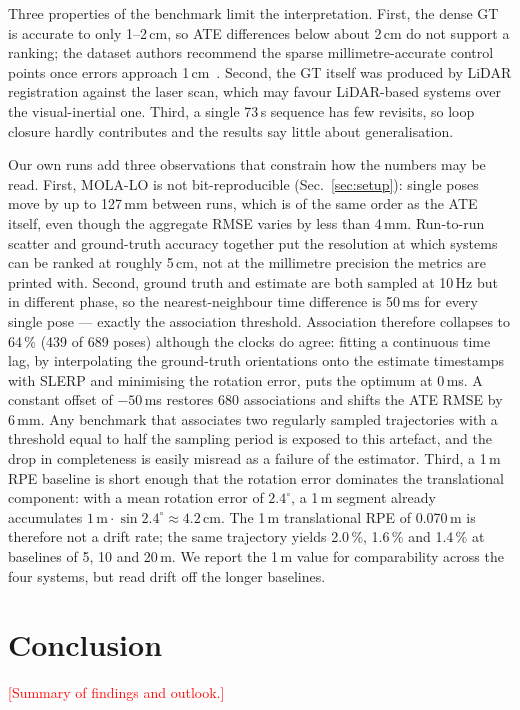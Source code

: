 \documentclass[conference]{IEEEtran}
\newcommand{\todo}[1]{\textcolor{red}{[#1]}}
\begin{document}
Three properties of the benchmark limit the interpretation. First, the dense GT is accurate to
only 1--2\,cm, so ATE differences below about 2\,cm do not support a ranking; the dataset authors
recommend the sparse millimetre-accurate control points once errors approach 1\,cm~\cite{zhang2023hilti}.
Second, the GT itself was produced by LiDAR registration against the laser scan, which may favour
LiDAR-based systems over the visual-inertial one. Third, a single 73\,s sequence has few
revisits, so loop closure hardly contributes and the results say little about generalisation.

Our own runs add three observations that constrain how the numbers may be read. First,
MOLA-LO is not bit-reproducible (Sec.~\ref{sec:setup}): single poses move by up to 127\,mm
between runs, which is of the same order as the ATE itself, even though the aggregate RMSE
varies by less than 4\,mm. Run-to-run scatter and ground-truth accuracy together put the
resolution at which systems can be ranked at roughly 5\,cm, not at the millimetre precision
the metrics are printed with. Second, ground truth and estimate are both sampled at 10\,Hz
but in different phase, so the nearest-neighbour time difference is 50\,ms for every single
pose --- exactly the association threshold. Association therefore collapses to 64\,\% (439
of 689 poses) although the clocks do agree: fitting a continuous time lag, by interpolating
the ground-truth orientations onto the estimate timestamps with SLERP and minimising the
rotation error, puts the optimum at 0\,ms. A constant offset of $-50$\,ms restores 680
associations and shifts the ATE RMSE by 6\,mm. Any benchmark that associates two regularly
sampled trajectories with a threshold equal to half the sampling period is exposed to this
artefact, and the drop in completeness is easily misread as a failure of the estimator.
Third, a 1\,m RPE baseline is short enough that the rotation error dominates the
translational component: with a mean rotation error of $2.4^\circ$, a 1\,m segment
already accumulates $1\,\text{m}\cdot\sin 2.4^\circ \approx 4.2$\,cm. The 1\,m translational
RPE of 0.070\,m is therefore not a drift rate; the same trajectory yields 2.0\,\%, 1.6\,\%
and 1.4\,\% at baselines of 5, 10 and 20\,m. We report the 1\,m value for comparability
across the four systems, but read drift off the longer baselines.

\section{Conclusion}
\todo{Summary of findings and outlook.}



\end{document}
